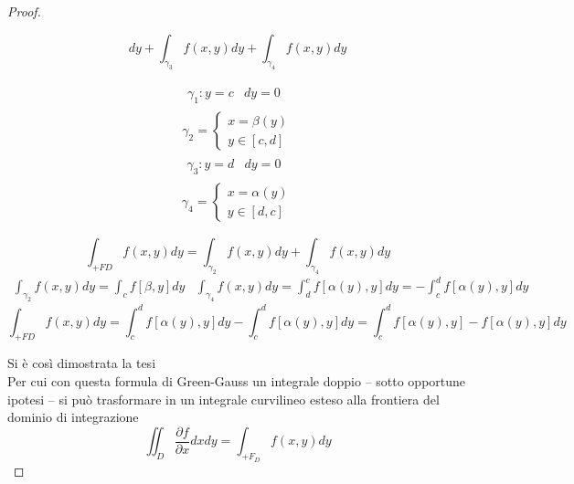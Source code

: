 \documentclass{book}
\begin{document}
\begin{proof}
\begin{description}
\begin{equation}
				dy+\int_{\gamma_3}f(x,y)dy+\int_{\gamma_4}f(x,y)dy
			\end{equation}
			\begin{multicols}{2}
				\begin{equation*}
					\begin{matrix}
						\begin{matrix}
							\gamma_1: y=c & dy=0
						\end{matrix}\\
						\gamma_2=\begin{cases}
							x=\beta(y)\\
							y\in[c,d]
						\end{cases}
					\end{matrix}
				\end{equation*}
				\begin{equation*}
					\begin{matrix}
						\begin{matrix}
							\gamma_3: y=d & dy=0
						\end{matrix}\\
						\gamma_4=\begin{cases}
							x=\alpha(y)\\
							y\in[d,c]
						\end{cases}
					\end{matrix}
				\end{equation*}
			\end{multicols}
			\begin{equation*}
				\int_{+FD}f(x,y)dy=\int_{\gamma_2}f(x,y)dy+\int_{\gamma_4}f(x,y)
				dy
			\end{equation*}
			\begin{equation*}
				\begin{matrix}
					\int_{\gamma_2}f(x,y)dy=\int_c f[\beta,y]dy &
					\int_{\gamma_4}f(x,y)dy=\int_{d}^{c}f[\alpha(y),y]dy=
					-\int_{c}^{d}f[\alpha(y),y]dy
				\end{matrix}
			\end{equation*}
			\begin{equation*}
				\int_{+FD}f(x,y)dy=\int_{c}^{d}f[\alpha(y),y]dy-
				\int_{c}^{d}f[\alpha(y),y]dy=\int_{c}^{d}f[\alpha(y),y]-
				f[\alpha(y),y]dy
			\end{equation*}
	\end{description}
	Si è così dimostrata la tesi\\
	Per cui con questa {\color{red}formula di Green-Gauss} un integrale doppio
	-- sotto opportune ipotesi -- si può trasformare in un integrale curvilineo
	esteso alla frontiera del dominio di integrazione
	\begin{equation*}
		\iint_D \frac{\partial f}{\partial x}dxdy=\int_{+F_D}f(x,y)dy
	\end{equation*}
\end{proof}
\end{document}
